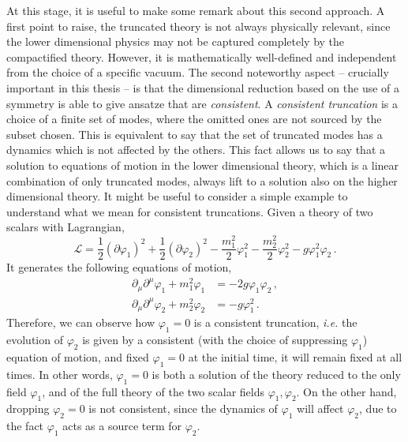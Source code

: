\documentclass[draft]{phd}
\begin{document}
			At this stage, it is useful to make some remark about this second approach.
			A first point to raise, the truncated theory is not always physically relevant, since the lower dimensional physics may not be captured completely by the compactified theory.
			However, it is mathematically well-defined and independent from the choice of a specific vacuum.
			The second noteworthy aspect -- crucially important in this thesis -- is that the dimensional reduction based on the use of a symmetry is able to give ansatze that are \emph{consistent}.
			A \emph{consistent truncation} is a choice of a finite set of modes, where the omitted ones are not sourced by the subset chosen. 
			This is equivalent to say that the set of truncated modes has a dynamics which is not affected by the others.
			This fact allows us to say that a solution to equations of motion in the lower dimensional theory, which is a linear combination of only truncated modes, always lift to a solution also on the higher dimensional theory.
			It might be useful to consider a simple example to understand what we mean for consistent truncations.
			Given a theory of two scalars with Lagrangian,
					\begin{equation*}
						\mathcal{L} = \frac{1}{2}\left(\partial \varphi_1 \right)^2 + \frac{1}{2}\left(\partial \varphi_2 \right)^2 - \frac{m_1^2}{2}\varphi_1^2 - \frac{m_2^2}{2}\varphi_2^2 - g \varphi_1^2\varphi_2 \, .
					\end{equation*}
			It generates the following equations of motion,
					\begin{equation*}
						\begin{split}
							\partial_\mu \partial^\mu \varphi_1 + m_1^2 \varphi_1 &= -2g\varphi_1\varphi_2 \, , \\
							\partial_\mu \partial^\mu \varphi_2 + m_2^2 \varphi_2 &= -g\varphi_1^2 \, .
						\end{split}
					\end{equation*}
			Therefore, we can observe how $\varphi_1 = 0$ is a consistent truncation, \emph{i.e.} the evolution of $\varphi_2$ is given by a consistent (with the choice of suppressing $\varphi_1$) equation of motion, and fixed $\varphi_1 = 0$ at the initial time, it will remain fixed at all times. 
			In other words, $\varphi_1 = 0$ is both a solution of the theory reduced to the only field $\varphi_1$, and of the full theory of the two scalar fields $\varphi_1,\varphi_2$. 
			On the other hand, dropping $\varphi_2 = 0$ is not consistent, since the dynamics of $\varphi_1$ will affect $\varphi_2$, due to the fact $\varphi_1$ acts as a source term for $\varphi_2$.
			
\end{document}
